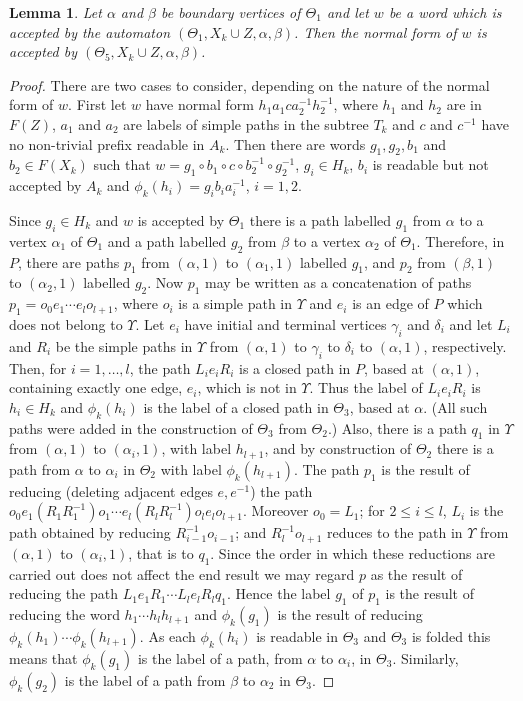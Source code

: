 \documentclass[a4paper,12pt]{article}
\renewcommand{\a}{\alpha }
\renewcommand{\b}{\beta }
\newcommand{\g}{\gamma }
\renewcommand{\d}{\delta }
\newcommand{\T}{\Theta }
\newcommand{\U}{\Upsilon }
\newtheorem{lemma}[theorem]{Lemma}
\numberwithin{equation}{section}
\numberwithin{figure}{section}
\begin{document}
\begin{lemma}
Let $\a$ and $\b$ be boundary vertices of $\T_1$ and let $w$ be a word
 which is accepted by the automaton $(\T_1, X_k\cup Z, \a, \b)$. Then the
normal form of $w$ is accepted by $(\T_5, X_k\cup Z, \a, \b)$. 
\end{lemma}
\begin{proof}
There are two cases to consider, depending on the nature of the 
normal form of $w$. First 
let $w$ have normal form $h_1 a_1 c a_2^{-1} h_2^{-1} $, where 
$h_1$ and $h_2$ are in $F(Z)$,  $a_1$ and $a_2$ are labels 
of simple paths in the subtree $T_k$ and $c$ and $c^{-1}$ have
no non-trivial prefix readable in $A_k$. Then there are words
$g_1, g_2, b_1$ and $b_2\in F(X_k)$ such that 
$w=g_1\circ b_1\circ c \circ b_2^{-1}\circ g_2^{-1}$, 
$g_i\in H_k$, $b_i$ is readable but not accepted by  $A_k$ and  
$\phi_k(h_i)=g_ib_ia_i^{-1}$, $i=1,2$. 

Since $g_i\in H_k$ and $w$ is accepted by $\T_1$ there is a path
labelled $g_1$ from $\a$ to a vertex $\a_1$ of $\T_1$ and a path
labelled $g_2$ from $\b$ to a vertex $\a_2$ of $\T_1$. Therefore, in $P$,
there are paths $p_1$ from $(\a,1)$ to $(\a_1,1)$ labelled $g_1$, and 
$p_2$  
from $(\b,1)$ to $(\a_2,1)$ labelled $g_2$. 
Now $p_1$ may 
be written as a concatenation of paths $p_1=o_0e_1\cdots e_l o_{l+1}$,
where $o_i$ is a simple path in $\U$ and $e_i$ is an edge of $P$ which does
not belong to $\U$.  Let $e_i$ have initial and terminal vertices 
$\g_i$ and $\d_i$ and let $L_i$ and $R_i$ be the simple paths in $\U$ from
$(\a,1)$ to $\g_i$ to $\d_i$ to $(\a,1)$, respectively. 
Then, for $i=1,\ldots ,l$, the path $L_i e_i R_i$ is a closed path in $P$, based
at $(\a,1)$, containing exactly one edge, $e_i$, which is not in $\U$. 
Thus the label of  $L_i e_i R_i$ is $h_i\in H_k$ and $\phi_k(h_i)$ is the
label of a closed path in $\T_3$, based at  $\a$. (All such paths
were added in the construction of $\T_3$ from $\T_2$.)   
Also, there is a path $q_1$ in $\U$ from $(\a,1)$ to $(\a_i,1)$, with 
label $h_{l+1}$, and by construction of $\T_2$ there is a path from $\a$ to
$\a_i$ in $\T_2$ with label $\phi_k(h_{l+1})$. 
The path
$p_1$ is the result of reducing (deleting adjacent edges $e,e^{-1}$) the path 
$o_0 e_1 (R_1 R_1^{-1}) o_1 \cdots e_{l}(R_l R_l^{-1}) o_{l}  e_l o_{l+1}$.
Moreover $o_0=L_1$; for $2\le i\le l$, 
$L_i$ is the path obtained by reducing $R_{i-1}^{-1}o_{i-1}$; and 
$R_{l}^{-1}o_{l+1}$ reduces to the path in $\U$ from 
$(\a,1)$ to $(\a_i,1)$, that is to $q_1$. 
Since the
order in which these reductions are carried out does not affect the end
result we may regard $p$ as the result of reducing the path
$L_1 e_1 R_1 \cdots L_l e_l R_l q_1$. Hence the label $g_1$ 
of $p_1$ is the result of 
reducing the word $h_1\cdots h_l h_{l+1}$ and $\phi_k(g_1)$ is the result of
reducing $\phi_k(h_1) \cdots \phi_k(h_{l+1})$. As each $\phi_k(h_i)$ is readable 
in $\T_3$ and $\T_3$ is folded this means  that $\phi_k(g_1)$ is the
label of a path, from $\a$ to   $\a_i$, in $\T_3$. Similarly, $\phi_k(g_2)$
is the label of a path from $\b$ to $\a_2$ in $\T_3$. 


\end{proof}
\end{document}
